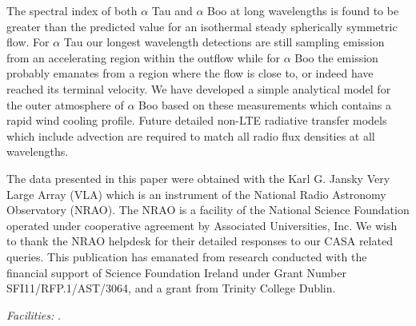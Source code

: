 \documentclass[iop]{emulateapj}
\begin{document}
The spectral index of both $\alpha$ Tau and $\alpha$ Boo at long wavelengths is found to be greater than the predicted value for an isothermal steady spherically symmetric flow. For $\alpha$ Tau our longest wavelength detections are still sampling emission from an accelerating region within the outflow while for $\alpha$ Boo the emission probably emanates from a region where the flow is close to, or indeed have reached its terminal velocity. We have developed a simple analytical model for the outer atmosphere of $\alpha$ Boo based on these measurements which contains a rapid wind cooling profile. Future detailed non-LTE radiative transfer models which include advection are required to match all radio flux densities at all wavelengths. 

\acknowledgments
The data presented in this paper were obtained with the Karl G. Jansky Very Large Array (VLA) which is an instrument of the National Radio Astronomy Observatory (NRAO). The NRAO is a facility of the National Science Foundation operated under cooperative agreement by Associated Universities, Inc. We wish to thank the NRAO helpdesk for their detailed responses to our CASA related queries. This publication has emanated from research conducted with the financial support of Science Foundation Ireland under Grant Number SFI11/RFP.1/AST/3064, and a grant from Trinity College Dublin.

{\it Facilities:} .




\end{document}
